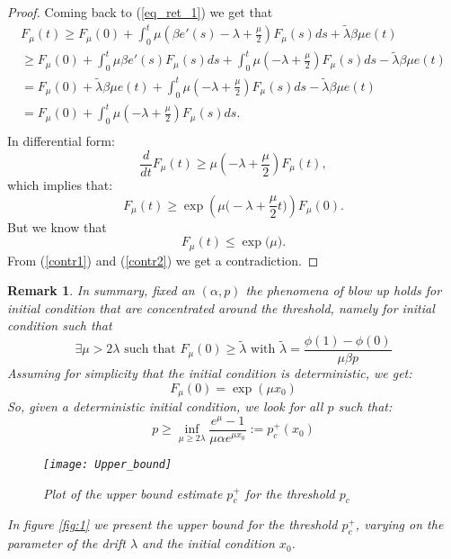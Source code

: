 \documentclass[11pt, a4paper]{article}
\newtheorem{remark}[theorem]{Remark}
\begin{document}
\begin{proof}
Coming back to (\ref{eq_ret_1}) we get that
\begin{multline*}
F_\mu(t)\geq F_\mu(0)+\int_0^t\mu\left(\beta e'(s)-\lambda +\frac{\mu}{2}\right)F_\mu(s)ds+\tilde{\lambda}\beta\mu e(t)\\
\geq F_\mu(0)+\int_0^t\mu\beta e'(s)F_\mu(s)ds+\int_0^t \mu \left(-\lambda +\frac{\mu}{2} \right) F_\mu(s)ds-\tilde{\lambda}\beta\mu e(t)\\
=F_\mu(0)+\tilde{\lambda}\beta\mu e(t)+\int_0^t \mu \left(-\lambda +\frac{\mu}{2} \right) F_\mu(s)ds-\tilde{\lambda}\beta\mu e(t)\\
=F_\mu(0)+\int_0^t \mu \left( -\lambda +\frac{\mu}{2} \right) F_\mu(s)ds.\\
\end{multline*}
In differential form:
\[ \frac{d}{dt}F_\mu(t) \geq \mu \left( -\lambda+\frac{\mu}{2} \right) F_\mu(t), \]
which implies that:
\begin{equation} \label{contr1} F_\mu(t)\geq \exp \left( \mu \Big( -\lambda+\frac{\mu}{2}t \Big) \right) F_\mu(0). \end{equation}
But we know that
\begin{equation} \label{contr2} F_\mu(t)\leq\exp \big( \mu \big). \end{equation}
From (\ref{contr1}) and (\ref{contr2}) we get a contradiction.
\end{proof}
\begin{remark}\label{rem: bu1}
In summary, fixed an $(\alpha,p)$ the phenomena of blow up holds for initial condition that are concentrated around the threshold, namely for initial condition such that
\[\exists \mu>2\lambda\text{ such that }F_\mu(0)\geq \tilde{\lambda}\text{ with }\tilde{\lambda}=\frac{\phi(1)-\phi(0)}{\mu\beta p} \]
Assuming for simplicity that the initial condition is deterministic, we get:
\[F_\mu(0)=\exp(\mu x_0)\]
So, given a deterministic initial condition, we look for all $p$ such that:
\[p\geq \inf_{\mu\geq 2\lambda}\frac{e^\mu-1}{\mu\alpha e^{\mu x_0}}:=p^+_c(x_0)\]

\begin{figure}
\centering
\texttt{[image: Upper\_bound]}
\caption{Plot of the upper bound estimate $p^+_c$ for the threshold $p_c$}
\end{figure}\label{fig:1}
In figure \ref{fig:1} we present the upper bound for the threshold $p^+_c$, varying on the parameter of the drift $\lambda$ and the initial condition $x_0$.
\end{remark}
\end{document}
